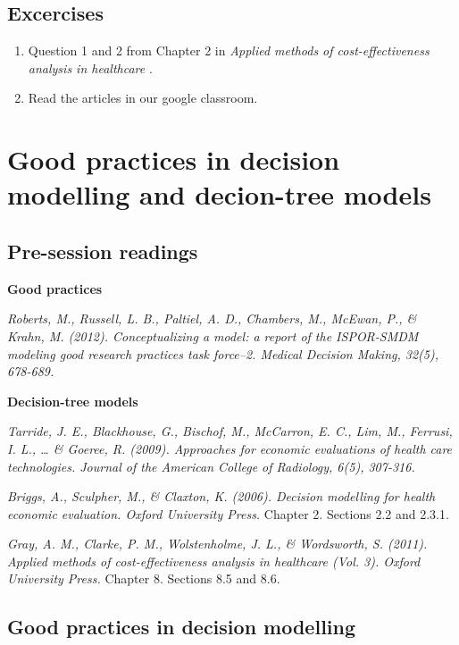 \documentclass[
]{book}
\providecommand{\tightlist}{%
  \setlength{\itemsep}{0pt}\setlength{\parskip}{0pt}}
\begin{document}
\hypertarget{excercises-1}{%
\section{Excercises}\label{excercises-1}}

\begin{enumerate}
\def\labelenumi{\arabic{enumi}.}
\tightlist
\item
  Question 1 and 2 from Chapter 2 in \emph{Applied methods of cost-effectiveness analysis in healthcare }.
\item
  Read the articles in our google classroom.
\end{enumerate}

\hypertarget{tree}{%
\chapter{Good practices in decision modelling and decion-tree models}\label{tree}}

\hypertarget{pre-session-readings-2}{%
\section{Pre-session readings}\label{pre-session-readings-2}}

\textbf{Good practices}

\emph{Roberts, M., Russell, L. B., Paltiel, A. D., Chambers, M., McEwan, P., \& Krahn, M. (2012). Conceptualizing a model: a report of the ISPOR-SMDM modeling good research practices task force--2. Medical Decision Making, 32(5), 678-689.}

\textbf{Decision-tree models}

\emph{Tarride, J. E., Blackhouse, G., Bischof, M., McCarron, E. C., Lim, M., Ferrusi, I. L., \ldots{} \& Goeree, R. (2009). Approaches for economic evaluations of health care technologies. Journal of the American College of Radiology, 6(5), 307-316.}

\emph{Briggs, A., Sculpher, M., \& Claxton, K. (2006). Decision modelling for health economic evaluation. Oxford University Press.} Chapter 2. Sections 2.2 and 2.3.1.

\emph{Gray, A. M., Clarke, P. M., Wolstenholme, J. L., \& Wordsworth, S. (2011). Applied methods of cost-effectiveness analysis in healthcare (Vol. 3). Oxford University Press.} Chapter 8. Sections 8.5 and 8.6.

\hypertarget{good-practices-in-decision-modelling}{%
\section{Good practices in decision modelling}\label{good-practices-in-decision-modelling}}
\end{document}
